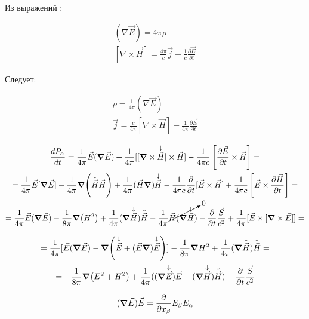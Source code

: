 Из выражений :

\begin{gather*}
    (\nabla \vec{E}) = 4\pi \rho  \\
    [\nabla \times \vec{ H}] = \frac{4\pi}{c} \vec{j} + \frac{1}{c} \frac{\partial \vec{E}}{\partial t} 
\end{gather*}

Следует:


\begin{gather*}
    \rho = \frac{1}{4\pi} (\nabla \vec{E})   \\
    \vec{j} = \frac{c}{4\pi} [\nabla \times \vec{H}] - \frac{1}{4\pi} \frac{\partial \vec{E}}{\partial t}
\end{gather*}

\begin{gather*}
    \frac{dP_{\alpha}}{dt}=\frac{1}{4\pi}\vec{E}(\grad\vec{E})+\frac{1}{4\pi}[[\grad \times  \overset{\downarrow}{\vec{H}}]\times \vec{H}]-\frac{1}{4\pi c} \left[ \frac{\partial \vec{E}}{\partial t} \times \vec{H} \right] = \\
    =\frac{1}{4\pi}\vec{E}[\grad\vec{E}]-\frac{1}{4\pi}\grad(\overset{\downarrow}{\vec{H}}\vec{H})+\frac{1}{4\pi}(\vec{H}\grad)\overset{\downarrow}{\vec{H}}-\frac{1}{4\pi c}\frac{\partial}{\partial t}[\vec{E}\times \vec{H}]+ \frac{1}{4\pi c} \left[ \vec{E}\times \frac{\partial\vec{H}}{\partial t}   \right]= \\
    =\frac{1}{4\pi}\vec{E}(\grad\vec{E})-\frac{1}{8\pi}\grad(H^2)+\frac{1}{4\pi}(\grad\overset{\downarrow}{\vec{H}})\overset{\downarrow}{\vec{H}}-\frac{1}{4\pi}\cancelto{0}{\vec{H}(\grad\overset{\downarrow}{\vec{H}})}-\frac{\partial}{\partial t}  \frac{\vec{S}}{c^2}+\frac{1}{4\pi}[\vec{E}\times [\grad \times \vec{E}]]= 
\end{gather*}

\begin{gather*}
    =\frac{1}{4\pi}[\vec{E}(\grad\vec{E})-\grad(\overset{\downarrow}{\vec{E}}+(\vec{E}\grad)\overset{\downarrow}{\vec{E}})]-\frac{1}{8\pi}\grad H^2 +\frac{1}{4\pi}(\grad \overset{\downarrow}{\vec{H}}) \overset{\downarrow}{\vec{H}} =\\
    =-\frac{1}{8\pi}\grad(E^2+H^2)+\frac{1}{4\pi}((\grad\overset{\downarrow}{\vec{E}})\vec{E}+(\grad\overset{\downarrow}{\vec{H}})\overset{\downarrow}{\vec{H}})- \frac{\partial}{\partial t} \frac{\vec{S} }{c^2}    
\end{gather*}

\[(\grad \vec{E})\vec{E}=\frac{\partial}{\partial x_{\beta} }E_{\beta}E_{\alpha}  \]

